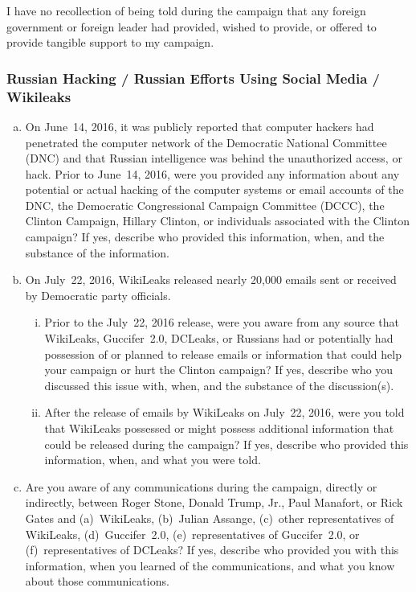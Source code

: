 I have no recollection of being told during the campaign that any foreign government or foreign leader had provided, wished to provide, or offered to provide tangible support to my campaign.

\subsubsection{Russian Hacking / Russian Efforts Using Social Media / Wikileaks}

\begin{enumerate}[a.]

\item On June~14, 2016, it was publicly reported that computer hackers had penetrated the computer network of the Democratic National Committee (DNC) and that Russian intelligence was behind the unauthorized access, or hack.
Prior to June~14, 2016, were you provided any information about any potential or actual hacking of the computer systems or email accounts of the DNC, the Democratic Congressional Campaign Committee (DCCC), the Clinton Campaign, Hillary Clinton, or individuals associated with the Clinton campaign?
If yes, describe who provided this information, when, and the substance of the information.

\item On July~22, 2016, WikiLeaks released nearly 20,000 emails sent or received by Democratic party officials.

\begin{enumerate}[i.]

\item Prior to the July~22, 2016 release, were you aware from any source that WikiLeaks, Guccifer~2.0, DCLeaks, or Russians had or potentially had possession of or planned to release emails or information that could help your campaign or hurt the Clinton campaign?
If yes, describe who you discussed this issue with, when, and the substance of the discussion(s).

\item After the release of emails by WikiLeaks on July~22, 2016, were you told that WikiLeaks possessed or might possess additional information that could be released during the campaign?
If yes, describe who provided this information, when, and what you were told.

\end{enumerate}

\item Are you aware of any communications during the campaign, directly or indirectly, between Roger Stone, Donald Trump, Jr., Paul Manafort, or Rick Gates and (a)~WikiLeaks, (b)~Julian Assange, (c)~other representatives of WikiLeaks, (d)~Guccifer~2.0, (e)~representatives of Guccifer~2.0, or (f)~representatives of DCLeaks?
If yes, describe who provided you with this information, when you learned of the communications, and what you know about those communications.


\end{enumerate}
